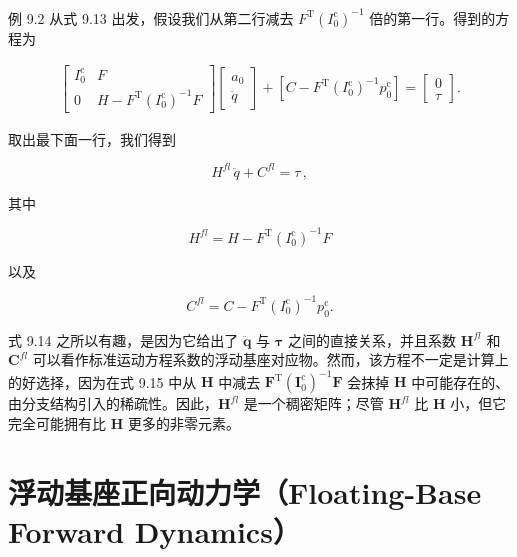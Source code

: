 \documentclass[10pt,a4paper]{book}
\theoremstyle{thmstyle} %
\theoremstyle{defstyle} %
\theoremstyle{prostyle} %
\begin{document}
例 9.2 从式 9.13 出发，假设我们从第二行减去 $F^{\mathrm{T}}(I_{0}^{\mathrm{c}})^{-1}$ 倍的第一行。得到的方程为



$$
\begin{array}{rl} { \left[ \begin{array}{ll} { I _ { 0 } ^{\mathrm { c} } } & { F } \\{ 0 } & { H - F ^{\mathrm { T} } ( I _ { 0 } ^{\mathrm { c} } ) ^{- 1} F } \end{array} \right] \left[ \begin{array}{l} { a _ { 0 } } \\{ \ddot { q } } \end{array} \right] + \left[ C - F ^{\mathrm { T} } ( I _ { 0 } ^{\mathrm { c} } ) ^{- 1} p _ { 0 } ^{\mathrm { c} } \right] = \left[ \begin{array}{l} { 0 } \\{ \tau } \end{array} \right] . } \end{array}
$$



取出最下面一行，我们得到



$$
H ^{f l} \, \ddot { q } + C ^{f l} = \tau \, ,
$$



其中



$$
H ^{f l} = H - F ^{\mathrm { T} } ( I _ { 0 } ^{\mathrm { c} } ) ^{- 1} F
$$



以及



$$
C ^{f l} = C - F ^{\mathrm { T} } ( I _ { 0 } ^{\mathrm { c} } ) ^{- 1} p _ { 0 } ^{\mathrm { c} } .
$$



式 9.14 之所以有趣，是因为它给出了 $\ddot{\mathbf{q}}$ 与 $\boldsymbol{\tau}$ 之间的直接关系，并且系数 $\mathbf{H}^{fl}$ 和 $\mathbf{C}^{fl}$ 可以看作标准运动方程系数的浮动基座对应物。然而，该方程不一定是计算上的好选择，因为在式 9.15 中从 $\mathbf{H}$ 中减去 $\mathbf{F}^{\mathrm{T}}(\mathbf{I}_{0}^{\mathrm{c}})^{-1} \mathbf{F}$ 会抹掉 $\mathbf{H}$ 中可能存在的、由分支结构引入的稀疏性。因此，$\mathbf{H}^{fl}$ 是一个稠密矩阵；尽管 $\mathbf{H}^{fl}$ 比 $\mathbf{H}$ 小，但它完全可能拥有比 $\mathbf{H}$ 更多的非零元素。



\section{浮动基座正向动力学（Floating-Base Forward Dynamics）}
\end{document}
